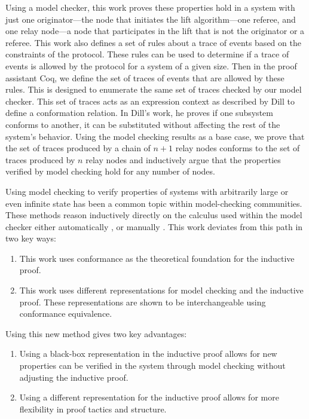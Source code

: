 \documentclass[runningheads]{llncs}
\newcommand{\coq}{Coq}
\begin{document}
Using a model checker, this work proves these properties hold in a system with just one originator---the node that initiates the lift algorithm---one referee, and one relay node---a node that participates in the lift that is not the originator or a referee. This work also defines a set of rules about a trace of events based on the constraints of the protocol. These rules can be used to determine if a trace of events is allowed by the protocol for a system of a given size. 
Then in the proof assistant \coq, we define the set of traces of events that are allowed by these rules. This is designed to enumerate the same set of traces checked by our model checker. This set of traces acts as an expression context as described by Dill \cite{dill_trace_theory} to define a conformation relation. In Dill's work, he proves if one subsystem conforms to another, it can be substituted without affecting the rest of the system's behavior. 
Using the model checking results as a base case, we prove that the set of traces produced by a chain of $n+1$ relay nodes conforms to the set of traces produced by $n$ relay nodes and inductively argue that the properties verified by model checking hold for any number of nodes.

Using model checking to verify properties of systems with arbitrarily large or even infinite state has been a common topic within model-checking communities. These methods reason inductively directly on the calculus used within the model checker either automatically \cite{reasoning_many_proc}\cite{liveness_inf_state}, or manually \cite{clarke_base_ismc}. This work deviates from this path in two key ways:
\begin{enumerate}
    \item This work uses conformance as the theoretical foundation for the inductive proof.
    \item This work uses different representations for model checking and the inductive proof. These representations are shown to be interchangeable using conformance equivalence.
\end{enumerate}
Using this new method gives two key advantages: 
\begin{enumerate}
    \item Using a black-box representation in the inductive proof allows for new properties can be verified in the system through model checking without adjusting the inductive proof.
    \item  Using a different representation for the inductive proof allows for more flexibility in proof tactics and structure.
\end{enumerate}
\end{document}
